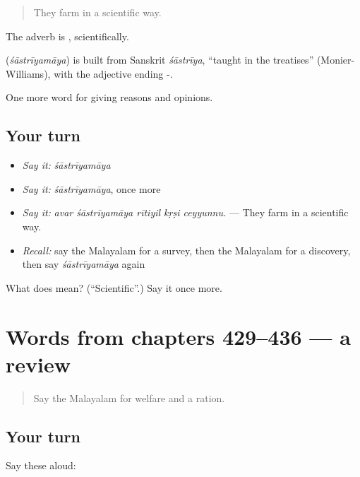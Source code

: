 \begin{quote}
They farm in a scientific way.
\end{quote}

The adverb is , scientifically.

\begin{cousinweb}
\textbf{} (\emph{śāstrīyamāya}) is built from Sanskrit \emph{śāstrīya}, \textquotedblleft{}taught in the treatises\textquotedblright{} (Monier-Williams), with the adjective ending -.
\end{cousinweb}

\begin{grammarlens}[title={What you've built}]
One more word for giving reasons and opinions.
\end{grammarlens}

\subsection*{Your turn}
\begin{itemize}
\raggedright
  \item \emph{Say it:} \emph{śāstrīyamāya}
  \item \emph{Say it:} \emph{śāstrīyamāya}, once more
  \item \emph{Say it:} \emph{avar śāstrīyamāya rītiyil kṛṣi ceyyunnu.} — They farm in a scientific way.
  \item \emph{Recall:} say the Malayalam for a survey, then the Malayalam for a discovery, then say \emph{śāstrīyamāya} again
\end{itemize}

\begin{tcolorbox}[breakable,colback=teal!4,colframe=teal!35!black,title={Before you move on}]
What does  mean? (\textquotedblleft{}Scientific\textquotedblright{}.) Say it once more.
\end{tcolorbox}
\section[(dialogue)]{Words from chapters 429–436 — a review}

\label{lesson:ML-R436-review-429-436}



\begin{quote}
Say the Malayalam for welfare and a ration.
\end{quote}

\subsection*{Your turn}
Say these aloud:

